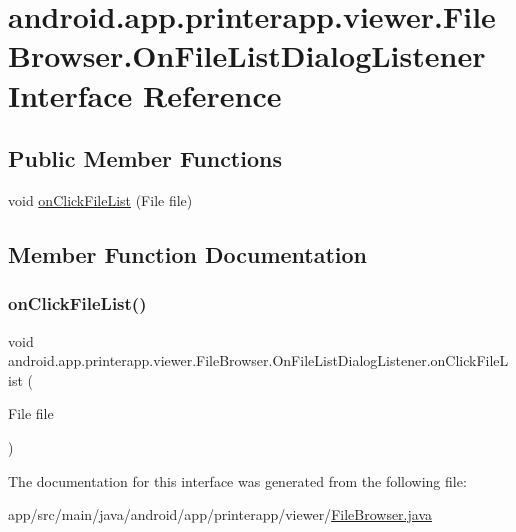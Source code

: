 \hypertarget{interfaceandroid_1_1app_1_1printerapp_1_1viewer_1_1_file_browser_1_1_on_file_list_dialog_listener}{}\section{android.\+app.\+printerapp.\+viewer.\+File\+Browser.\+On\+File\+List\+Dialog\+Listener Interface Reference}
\label{interfaceandroid_1_1app_1_1printerapp_1_1viewer_1_1_file_browser_1_1_on_file_list_dialog_listener}
\subsection*{Public Member Functions}
\begin{DoxyCompactItemize}
\item 
void \hyperlink{interfaceandroid_1_1app_1_1printerapp_1_1viewer_1_1_file_browser_1_1_on_file_list_dialog_listener_aeba83c832ed7aaf79520a7ca166aec31}{on\+Click\+File\+List} (File file)
\end{DoxyCompactItemize}


\subsection{Member Function Documentation}
\mbox{\label{interfaceandroid_1_1app_1_1printerapp_1_1viewer_1_1_file_browser_1_1_on_file_list_dialog_listener_aeba83c832ed7aaf79520a7ca166aec31}} 
\subsubsection{\texorpdfstring{on\+Click\+File\+List()}{onClickFileList()}}
{\footnotesize\ttfamily void android.\+app.\+printerapp.\+viewer.\+File\+Browser.\+On\+File\+List\+Dialog\+Listener.\+on\+Click\+File\+List (\begin{DoxyParamCaption}\item[{File}]{file }\end{DoxyParamCaption})}



The documentation for this interface was generated from the following file\+:\begin{DoxyCompactItemize}
\item 
app/src/main/java/android/app/printerapp/viewer/\hyperlink{_file_browser_8java}{File\+Browser.\+java}\end{DoxyCompactItemize}
